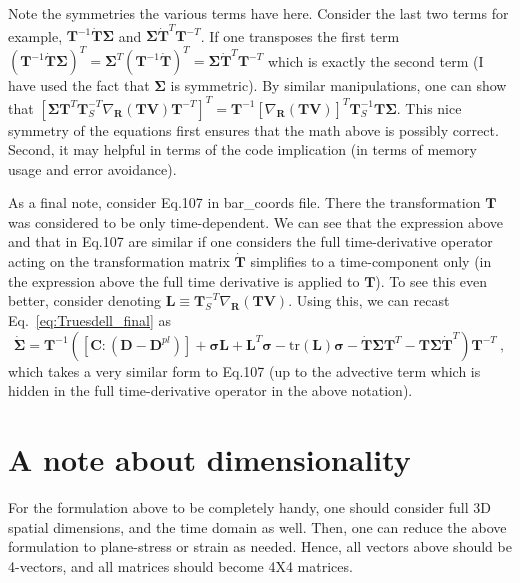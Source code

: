 \documentclass[12pt,a4paper]{article}
\begin{document}
Note the symmetries the various terms have here. Consider the last two terms for example, $\bm{T}^{-1}\dot{\bm{T}}\bm{\Sigma}$ and $\bm{\Sigma}\dot{\bm{T}}^{T}\bm{T}^{-T}$. If one transposes the first term $\left(\bm{T}^{-1}\dot{\bm{T}}\bm{\Sigma}\right)^T=\bm{\Sigma}^{T}\left(\bm{T}^{-1}\dot{\bm{T}}\right)^T=\bm{\Sigma}\dot{\bm{T}}^{T}\bm{T}^{-T}$ which is exactly the second term (I have used the fact that $\bm{\Sigma}$ is symmetric). By similar manipulations, one can show that $\left[\bm{\Sigma}\bm{T}^{T} \bm{T}^{-T}_S \nabla_{\bm{R}}\left(\bm{T V}\right)\bm{T}^{-T}\right]^{T} = \bm{T}^{-1}\left[\nabla_{\bm{R}}\left(\bm{T V}\right)\right]^{T}\bm{T}^{-1}_S\bm{T}\bm{\Sigma}$. This nice symmetry of the equations first ensures that the math above is possibly correct. Second, it may helpful in terms of the code implication (in terms of memory usage and error avoidance).

As a final note, consider Eq.107 in bar\_coords file. There the transformation $\bm{T}$ was considered to be only time-dependent. We can see that the expression above and that in Eq.107 are similar if one considers the full time-derivative operator acting on the transformation matrix $\dot{\bm{T}}$ simplifies to a time-component only (in the expression above the full time derivative is applied to $\bm{T}$). To see this even better, consider denoting $\bm{L}\equiv\bm{T}^{-T}_S \nabla_{\bm{R}}\left(\bm{T V}\right)$. Using this, we can recast Eq.~\eqref{eq:Truesdell_final} as
\begin{equation}\label{eq:Truesdell_simple}
  \dot{\bm{\Sigma}}= \bm{T}^{-1}\left(
                                           \left[\bm{C}:\left(\bm{D} - \bm{D}^{pl}\right)\right]
                                           + \bm{\sigma}\bm{L} + \bm{L}^{T}\bm{\sigma} - \text{tr}\left(\bm{L}\right)\bm{\sigma}
                                             -\dot{\bm{T}}\bm{\Sigma}\bm{T}^{T} - \bm{T}\bm{\Sigma}\dot{\bm{T}}^{T}
                                      \right)\bm{T}^{-T}  \ ,
\end{equation}
which takes a very similar form to Eq.107 (up to the advective term which is hidden in the full time-derivative operator in the above notation).
\section*{ A note about dimensionality}
For the formulation above to be completely handy, one should consider full 3D spatial dimensions, and the time domain as well. Then, one can reduce the above formulation to plane-stress or strain as needed. Hence, all vectors above should be 4-vectors, and all matrices should become 4X4 matrices.
\end{document}
